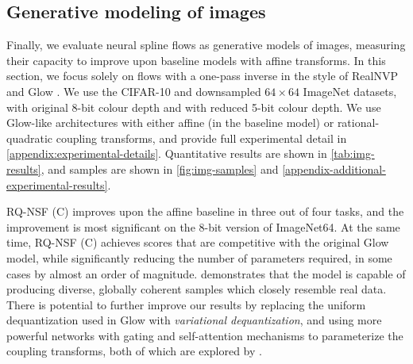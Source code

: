 \subsection{Generative modeling of images}
\label{sec:gen_image_modeling}

Finally, we evaluate neural spline flows as generative models of images, measuring their capacity to improve upon baseline models with affine transforms.
In this section, we focus solely on flows with a one-pass inverse in the style of RealNVP \citep{Dinh:2017:rnvp} and Glow \citep{Kingma:2018:glow}.
We use the CIFAR-10 \citep{krizhevsky:2009:cifar10} and downsampled $64\times64$ ImageNet \citep{oord2016pixelrnn, russakovsky:2015:imagenet} datasets, with original 8-bit colour depth and with reduced 5-bit colour depth. 
We use Glow-like architectures with either affine (in the baseline model) or rational-quadratic coupling transforms, and provide full experimental detail in \cref{appendix:experimental-details}.
Quantitative results are shown in \cref{tab:img-results}, and samples are shown in \cref{fig:img-samples} and \cref{appendix-additional-experimental-results}.

RQ-NSF (C) improves upon the affine baseline in three out of four tasks, and the improvement is most significant on the 8-bit version of ImageNet64. At the same time, RQ-NSF (C) achieves scores that are competitive with the original Glow model, while significantly reducing the number of parameters required, in some cases by almost an order of magnitude.
 demonstrates that the model is capable of producing diverse, globally coherent samples which closely resemble real data. 
There is potential to further improve our results by replacing the uniform dequantization used in Glow with \textit{variational dequantization}, and using more powerful networks with gating and self-attention mechanisms to parameterize the coupling transforms, both of which are explored by \citet{Ho:2019:flowpp}.